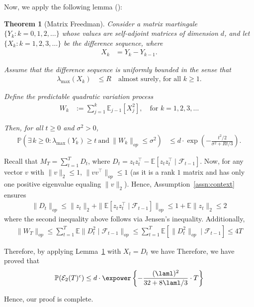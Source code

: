 \documentclass[11pt,letterpaper]{article}
\newcommand{\Prob}{\mathbb{P}}
\newcommand{\Exs}{\mathbb{E}}
\newcommand{\Etwo}{\mathcal{E}_2(T)}
\theoremstyle{plain}
\newtheorem{theorem}{Theorem}
\theoremstyle{definition}  %
\begin{document}
\noindent Now, we apply the following lemma (\citet{tropp2011freedman}):
\begin{theorem}[Matrix Freedman]
\label{thm:matrix-freedman}
Consider a matrix martingale $\{Y_k : k = 0,1,2,\dots\}$ whose values are
self-adjoint matrices of dimension $d$, and let
$\{X_k : k = 1,2,3,\dots\}$ be the difference sequence, where
\begin{align*}
X_k &= Y_k - Y_{k-1}.
\end{align*}

\noindent Assume that the difference sequence is uniformly bounded in the sense that
\begin{align*}
\lambda_{\max}(X_k) &\le R
\quad \text{almost surely, for all } k \ge 1.
\end{align*}

\noindent Define the predictable quadratic variation process
\begin{align*}
W_k &:= \sum_{j=1}^k \mathbb{E}_{j-1}\!\left[X_j^2\right],
\quad \text{for } k = 1,2,3,\dots
\end{align*}

\noindent Then, for all $t \ge 0$ and $\sigma^2 > 0$,
\begin{align*}
\mathbb{P}\!\left(
\exists\, k \ge 0 :
\lambda_{\max}(Y_k) \ge t
\ \text{and}\ 
\|W_k\|_{op} \le \sigma^2
\right)
&\le
d \cdot \exp\!\left(
-\frac{t^2/2}{\sigma^2 + Rt/3}
\right).
\end{align*}
\end{theorem}


\noindent Recall that $M_T = \sum^T_{t=1}D_t$, where $D_t = z_t z_t^\top - \Exs[z_t z_t^\top \mid \mathcal{F}_{t -1}]$. Now, for any vector $v$ with $\|v\|_2 \leq 1$, $\|vv^\top\|_{op} \leq 1$ (as it is a rank $1$ matrix and has only one positive eigenvalue equaling $\|v \|_2$). Hence, Assumption~\eqref{assn:context} ensures  
%
\begin{align*}
    \|D_t\|_{op} \leq \|z_t\|_2 +  \| \Exs [z_t z_t^\top \mid \mathcal{F}_{t - 1}]\|_{op} \leq 1 + \Exs \|z_t\|_2 \leq 2 
\end{align*}
where the second inequality above follows via Jensen's inequality. Additionally, 
%
\begin{align*}
 \| W_T\|_{op} \leq \sum_{t = 1}^T \Exs\|D_t^2 \mid \mathcal{F}_{t-1}\|_{op} \leq 
 \sum_{t = 1}^T \Exs[\|D_t^2 \|_{op}\mid \mathcal{F}_{t-1}] \leq 4T
\end{align*}

\noindent Therefore, by applying Lemma~\ref{thm:matrix-freedman}  with $X_t = D_t$ we have
\noindent Therefore, we have proved that
\begin{align*}
     \Prob(\Etwo^c) \leq  d \cdot \expower\left\{ - \frac{(\laml)^2}{32 +  8\laml/3} \cdot  T\right\}
\end{align*}

\noindent Hence, our proof is complete. 
\end{document}
